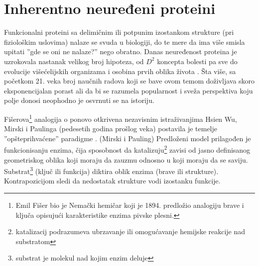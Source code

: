 
\chapter{Inherentno neuređeni proteini} %

\label{IDP} %


Funkcionalni proteini sa delimičnim ili potpunim izostankom strukture (pri
fiziološkim uslovima) nalaze se svuda u biologiji, do te mere da ima više
smisla upitati ''gde se oni ne nalaze?'' nego obratno\parencite{uversky2016}.
Danas neuređenost proteina je uzrokovala nastanak velikog broj hipoteza, od
$D^2$ koncepta bolesti\parencite{d2uversky2008} pa sve do evolucije
višećelijskih organizama\parencite{romero2006} i osobina prvih oblika života
\parencite{trifonov2000, uversky2016}. Šta više, sa početkom 21. veka broj
naučnih radova koji se bave ovom temom doživljava skoro eksponencijalan
porast\parencite{oldfield2014} ali  da bi se razumela popularnost i sveža
perspektiva koju polje donosi neophodno je osvrnuti se na istoriju.

Fišerova\footnote{ Emil Fišer bio je Nemački hemičar koji je 1894. predložio
analogiju brave i ključa opisujući karakteristike enzima pivske
plesni\parencite{dunker2001}.  } analogija o  ponovo
otkrivena nezavisnim istraživanjima Hsien Wu,  Mirski i Paulinga (pedesetih
godina prošlog veka) postavila je temelje ''opšteprihvaćene''
 paradigme \parencite{dunker2001}.
 (Mirski i Pauling) Predloženi model prilagođen je
funkcionisanju enzima, čija sposobnost da katalizuju\footnote{katalizacij
podrazumeva ubrzavanje ili omogućavanje hemijske reakcije nad
substratom\parencite{biology}}  zavisi od jasno definisanog geometriskog oblika
koji moraju da zauzmu odnosno u koji moraju da se saviju.
Substrat\footnote{substrat je molekul nad kojim enzim
deluje\parencite{biology}} (ključ ili funkcija) diktira oblik enzima (brave ili
strukture)\parencite{biology}.  Kontrapozicijom sledi da nedostatak strukture
vodi izostanku funkcije.

